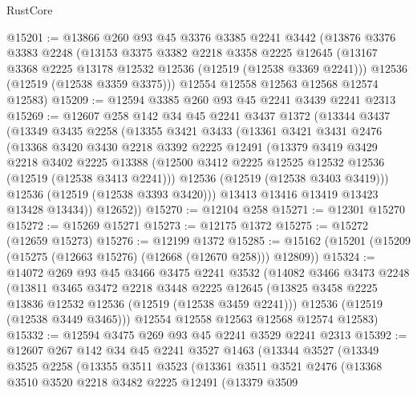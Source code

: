 \begin{lexlean}{RustCore}
\begin{coremodule}
@15201 := @13866
    @260
    @93
    @45
    @3376
    @3385
    @2241
    @3442
    (@13876
      @3376
      @3383
      @2248
      (@13153
        @3375
        @3382
        @2218
        @3358
        @2225
        @12645
        (@13167 @3368 @2225 @13178 @12532 @12536 (@12519 (@12538 @3369 @2241)))
        @12536
        (@12519 (@12538 @3359 @3375)))
      @12554
      @12558
      @12563
      @12568
      @12574
      @12583)
@15209 := @12594 @3385 @260 @93 @45 @2241 @3439 @2241 @2313
@15269 := @12607
    @258
    @142
    @34
    @45
    @2241
    @3437
    @1372
    (@13344
      @3437
      (@13349
        @3435
        @2258
        (@13355
          @3421
          @3433
          (@13361
            @3421
            @3431
            @2476
            (@13368
              @3420
              @3430
              @2218
              @3392
              @2225
              @12491
              (@13379
                @3419
                @3429
                @2218
                @3402
                @2225
                @13388
                (@12500 @3412 @2225 @12525 @12532 @12536 (@12519 (@12538 @3413 @2241)))
                @12536
                (@12519 (@12538 @3403 @3419)))
              @12536
              (@12519 (@12538 @3393 @3420)))
            @13413
            @13416
            @13419
            @13423
            @13428
            @13434))
        @12652))
@15270 := @12104 @258
@15271 := @12301 @15270
@15272 := @15269 @15271
@15273 := @12175 @1372
@15275 := @15272 (@12659 @15273)
@15276 := @12199 @1372
@15285 := @15162 (@15201 (@15209 (@15275 (@12663 @15276) (@12668 (@12670 @258))) @12809))
@15324 := @14072
    @269
    @93
    @45
    @3466
    @3475
    @2241
    @3532
    (@14082
      @3466
      @3473
      @2248
      (@13811
        @3465
        @3472
        @2218
        @3448
        @2225
        @12645
        (@13825 @3458 @2225 @13836 @12532 @12536 (@12519 (@12538 @3459 @2241)))
        @12536
        (@12519 (@12538 @3449 @3465)))
      @12554
      @12558
      @12563
      @12568
      @12574
      @12583)
@15332 := @12594 @3475 @269 @93 @45 @2241 @3529 @2241 @2313
@15392 := @12607
    @267
    @142
    @34
    @45
    @2241
    @3527
    @1463
    (@13344
      @3527
      (@13349
        @3525
        @2258
        (@13355
          @3511
          @3523
          (@13361
            @3511
            @3521
            @2476
            (@13368
              @3510
              @3520
              @2218
              @3482
              @2225
              @12491
              (@13379
                @3509

\end{coremodule}
\end{lexlean}
